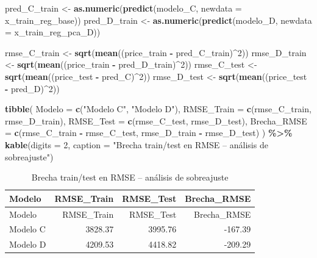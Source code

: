 \documentclass[
]{article}
\newenvironment{Shaded}{\begin{snugshade}}{\end{snugshade}}
\newcommand{\AttributeTok}[1]{\textcolor[rgb]{0.13,0.29,0.53}{#1}}
\newcommand{\DecValTok}[1]{\textcolor[rgb]{0.00,0.00,0.81}{#1}}
\newcommand{\FunctionTok}[1]{\textcolor[rgb]{0.13,0.29,0.53}{\textbf{#1}}}
\newcommand{\NormalTok}[1]{#1}
\newcommand{\OtherTok}[1]{\textcolor[rgb]{0.56,0.35,0.01}{#1}}
\newcommand{\SpecialCharTok}[1]{\textcolor[rgb]{0.81,0.36,0.00}{\textbf{#1}}}
\newcommand{\StringTok}[1]{\textcolor[rgb]{0.31,0.60,0.02}{#1}}
\begin{document}
\begin{Shaded}
\begin{Highlighting}[]
\NormalTok{pred\_C\_train }\OtherTok{\textless{}{-}} \FunctionTok{as.numeric}\NormalTok{(}\FunctionTok{predict}\NormalTok{(modelo\_C, }\AttributeTok{newdata =}\NormalTok{ x\_train\_reg\_base))}
\NormalTok{pred\_D\_train }\OtherTok{\textless{}{-}} \FunctionTok{as.numeric}\NormalTok{(}\FunctionTok{predict}\NormalTok{(modelo\_D, }\AttributeTok{newdata =}\NormalTok{ x\_train\_reg\_pca\_D))}

\NormalTok{rmse\_C\_train }\OtherTok{\textless{}{-}} \FunctionTok{sqrt}\NormalTok{(}\FunctionTok{mean}\NormalTok{((price\_train }\SpecialCharTok{{-}}\NormalTok{ pred\_C\_train)}\SpecialCharTok{\^{}}\DecValTok{2}\NormalTok{))}
\NormalTok{rmse\_D\_train }\OtherTok{\textless{}{-}} \FunctionTok{sqrt}\NormalTok{(}\FunctionTok{mean}\NormalTok{((price\_train }\SpecialCharTok{{-}}\NormalTok{ pred\_D\_train)}\SpecialCharTok{\^{}}\DecValTok{2}\NormalTok{))}
\NormalTok{rmse\_C\_test  }\OtherTok{\textless{}{-}} \FunctionTok{sqrt}\NormalTok{(}\FunctionTok{mean}\NormalTok{((price\_test  }\SpecialCharTok{{-}}\NormalTok{ pred\_C)}\SpecialCharTok{\^{}}\DecValTok{2}\NormalTok{))}
\NormalTok{rmse\_D\_test  }\OtherTok{\textless{}{-}} \FunctionTok{sqrt}\NormalTok{(}\FunctionTok{mean}\NormalTok{((price\_test  }\SpecialCharTok{{-}}\NormalTok{ pred\_D)}\SpecialCharTok{\^{}}\DecValTok{2}\NormalTok{))}

\FunctionTok{tibble}\NormalTok{(}
  \AttributeTok{Modelo      =} \FunctionTok{c}\NormalTok{(}\StringTok{"Modelo C"}\NormalTok{, }\StringTok{"Modelo D"}\NormalTok{),}
  \AttributeTok{RMSE\_Train  =} \FunctionTok{c}\NormalTok{(rmse\_C\_train, rmse\_D\_train),}
  \AttributeTok{RMSE\_Test   =} \FunctionTok{c}\NormalTok{(rmse\_C\_test,  rmse\_D\_test),}
  \AttributeTok{Brecha\_RMSE =} \FunctionTok{c}\NormalTok{(rmse\_C\_train }\SpecialCharTok{{-}}\NormalTok{ rmse\_C\_test, rmse\_D\_train }\SpecialCharTok{{-}}\NormalTok{ rmse\_D\_test)}
\NormalTok{) }\SpecialCharTok{\%\textgreater{}\%}
  \FunctionTok{kable}\NormalTok{(}\AttributeTok{digits =} \DecValTok{2}\NormalTok{, }\AttributeTok{caption =} \StringTok{"Brecha train/test en RMSE – análisis de sobreajuste"}\NormalTok{)}
\end{Highlighting}
\end{Shaded}

\begin{longtable}[]{@{}lrrr@{}}
\caption{Brecha train/test en RMSE -- análisis de
sobreajuste}\tabularnewline
\toprule\noalign{}
Modelo & RMSE\_Train & RMSE\_Test & Brecha\_RMSE \\
\midrule\noalign{}
\endfirsthead
\toprule\noalign{}
Modelo & RMSE\_Train & RMSE\_Test & Brecha\_RMSE \\
\midrule\noalign{}
\endhead
\bottomrule\noalign{}
\endlastfoot
Modelo C & 3828.37 & 3995.76 & -167.39 \\
Modelo D & 4209.53 & 4418.82 & -209.29 \\
\end{longtable}
\end{document}

